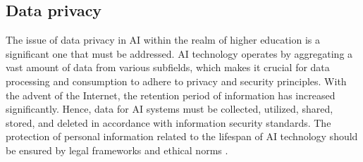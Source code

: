 \subsection{Data privacy}
The issue of data privacy in AI within the realm of higher education is a significant one that must be addressed.
AI technology operates by aggregating a vast amount of data from various subfields, which makes it crucial for data
processing and consumption to adhere to privacy and security principles. With the advent of the Internet, the retention
period of information has increased significantly. Hence, data for AI systems must be collected, utilized, shared, stored,
and deleted in accordance with information security standards. The protection of personal information related to the lifespan
of AI technology should be ensured by legal frameworks and ethical norms \citep{unesco_2022}.
